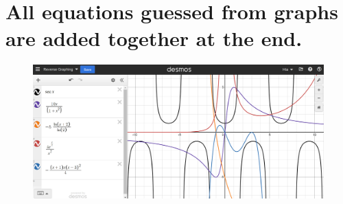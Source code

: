 \documentclass{article}
\begin{document}
\section*{All equations guessed from graphs are added together at the end.}

\begin{figure}[h]
    \centering
    \includegraphics[width=1\textwidth]{imgs/imgs FSE/All_of_them.png}
    \label{fig:image}
\end{figure}
\end{document}
